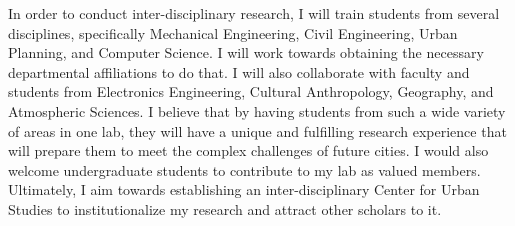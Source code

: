 \documentclass[12pt]{article}
\begin{document}
In order to conduct inter-disciplinary research, I will train students from several disciplines, specifically Mechanical Engineering, Civil Engineering, Urban Planning, and Computer Science. I will work towards obtaining the necessary departmental affiliations to do that. I will also collaborate with faculty and students from Electronics Engineering, Cultural Anthropology, Geography, and Atmospheric Sciences. I believe that by having students from such a wide variety of areas in one lab, they will have a unique and fulfilling research experience that will prepare them to meet the complex challenges of future cities. I would also welcome undergraduate students to contribute to my lab as valued members. Ultimately, I aim towards establishing an inter-disciplinary Center for Urban Studies to institutionalize my research and attract other scholars to it.

 

\end{document}
